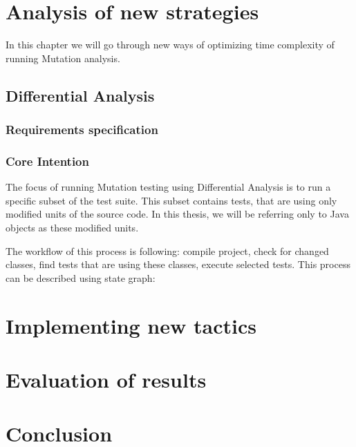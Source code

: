 \documentclass[
  digital, %
  table,   %
  lof,     %
  lot,     %
]{fithesis3}
\begin{document}
\chapter{Analysis of new strategies}
In this chapter we will go through new ways of optimizing time complexity of running Mutation analysis.
\section{Differential Analysis}
\subsection{Requirements specification}
\subsection{Core Intention}
The focus of running Mutation testing using Differential Analysis is to run a specific subset of the test suite. This subset contains tests, that are using only modified units of the source code. In this thesis, we will be referring only to Java objects as these modified units.
\par The workflow of this process is following: compile project, check for changed classes, find tests that are using these classes, execute selected tests. This process can be described using state graph:
\chapter{Implementing new tactics}
\chapter{Evaluation of results}
\chapter{Conclusion}
\end{document}
